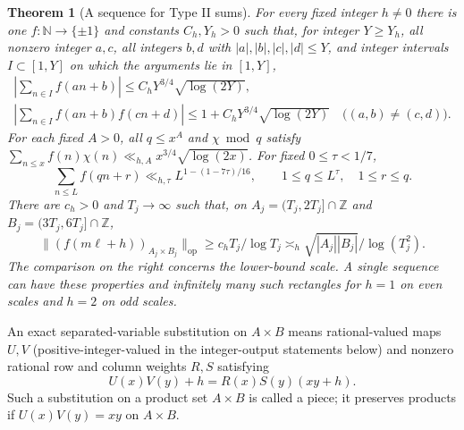 \documentclass[11pt]{article}
\newtheorem{theorem}{Theorem}[section]
\theoremstyle{definition}
\newcommand{\Z}{\mathbb Z}
\newcommand{\N}{\mathbb N}
\theoremstyle{remark}
\numberwithin{equation}{section}
\newcommand{\op}{\mathrm{op}}
\begin{document}
\begin{theorem}[A sequence for Type II sums]\label{thm:type-model}
For every fixed integer $h\ne0$ there is one $f:\N\to\{\pm1\}$ and constants $C_h,Y_h>0$ such that,
for integer $Y\ge Y_h$, all nonzero integer $a,c$, all integers $b,d$ with
$|a|,|b|,|c|,|d|\le Y$, and integer intervals $I\subset[1,Y]$ on which the arguments lie in $[1,Y]$,
\begin{equation}\label{eq:type-affine}
\begin{gathered}
 \left|\sum_{n\in I}f(an+b)\right|\le C_hY^{3/4}\sqrt{\log(2Y)},\\
 \left|\sum_{n\in I}f(an+b)f(cn+d)\right|\le1+C_hY^{3/4}\sqrt{\log(2Y)}
 \quad\bigl((a,b)\ne(c,d)\bigr).
\end{gathered}
\end{equation}
For each fixed $A>0$, all $q\le x^A$ and $\chi\bmod q$ satisfy
$\sum_{n\le x}f(n)\chi(n)\ll_{h,A}x^{3/4}\sqrt{\log(2x)}$.
For fixed $0\le\tau<1/7$,
\begin{equation}\label{eq:type-one}
 \sum_{n\le L}f(qn+r)\ll_{h,\tau}L^{1-(1-7\tau)/16},\qquad
 1\le q\le L^\tau,\quad1\le r\le q.
\end{equation}
There are $c_h>0$ and $T_j\to\infty$ such that, on $A_j=(T_j,2T_j]\cap\Z$ and $B_j=(3T_j,6T_j]\cap\Z$,
\begin{equation}\label{eq:type-large}
 \|(f(m\ell+h))_{A_j\times B_j}\|_\op
 \ge c_hT_j/\log T_j\asymp_h\sqrt{|A_j||B_j|}/\log(T_j^2).
\end{equation}
The comparison on the right concerns the lower-bound scale. A single sequence can have these properties
and infinitely many such rectangles for $h=1$ on even scales and $h=2$ on odd scales.
\end{theorem}
An exact separated-variable substitution on $A\times B$ means rational-valued maps $U,V$
(positive-integer-valued in the integer-output statements below) and nonzero rational row and column
weights $R,S$ satisfying
\begin{equation}\label{eq:separated}
 U(x)V(y)+h=R(x)S(y)(xy+h).
\end{equation}
Such a substitution on a product set $A\times B$ is called a piece; it preserves products if $U(x)V(y)=xy$ on $A\times B$.
\end{document}

